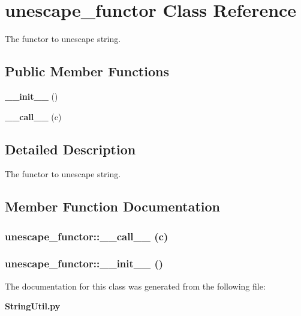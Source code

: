 \section{unescape\_\-functor Class Reference}
\label{classunescape__functor}
The functor to unescape string.  


\subsection*{Public Member Functions}
\begin{CompactItemize}
\item 
{\bf \_\-\_\-init\_\-\_\-} ()
\item 
{\bf \_\-\_\-call\_\-\_\-} (c)
\end{CompactItemize}


\subsection{Detailed Description}
The functor to unescape string. 



\subsection{Member Function Documentation}
\subsubsection{\setlength{\rightskip}{0pt plus 5cm}unescape\_\-functor::\_\-\_\-call\_\-\_\- (c)}\label{classunescape__functor_unescape__functora1}


\subsubsection{\setlength{\rightskip}{0pt plus 5cm}unescape\_\-functor::\_\-\_\-init\_\-\_\- ()}\label{classunescape__functor_unescape__functora0}




The documentation for this class was generated from the following file:\begin{CompactItemize}
\item 
{\bf String\-Util.py}\end{CompactItemize}
